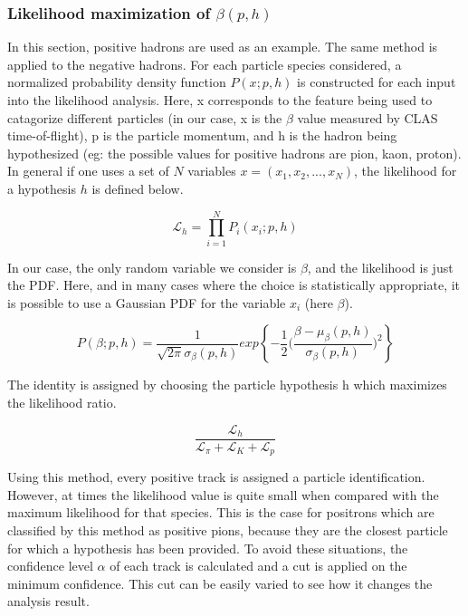 
\subsubsection*{Likelihood maximization of $\beta(p,h)$}
In this section, positive hadrons are used as an example.  The same method is applied to the negative hadrons.  For each particle species considered, a normalized probability density function $P(x;p,h)$ is constructed for each input into the likelihood analysis.  Here, x corresponds to the feature being used to catagorize different particles (in our case, x is the $\beta$ value measured by CLAS time-of-flight), p is the particle momentum, and h is the hadron being hypothesized (eg: the possible values for positive hadrons are pion, kaon, proton).  In general if one uses a set of $N$ variables $x = (x_1, x_2, ..., x_N)$, the likelihood for a hypothesis $h$ is defined below.

\begin{equation}
  \mathcal{L}_h = \prod^{N}_{i=1} P_{i} (x_i; p, h)
\end{equation}

In our case, the only random variable we consider is $\beta$, and the likelihood is just the PDF.  Here, and in many cases where the choice is statistically appropriate, it is possible to use a Gaussian PDF for the variable $x_i$ (here $\beta$).

\begin{equation}
  P(\beta;p,h) = \frac{1}{\sqrt{2 \pi} \sigma_\beta(p,h) } exp \left \{ -\frac{1}{2} \bigg( \frac{\beta - \mu_\beta(p,h)}{\sigma_\beta(p,h)} \bigg)^2 \right \}
\end{equation}

The identity is assigned by choosing the particle hypothesis h which maximizes the likelihood ratio.  
 
\begin{equation}
  \frac{\mathcal{L}_h}{\mathcal{L}_{\pi}+\mathcal{L}_{K}+\mathcal{L}_{p}}
\end{equation}

Using this method, every positive track is assigned a particle identification.  However, at times the likelihood value is quite small when compared with the maximum likelihood for that species.  This is the case for positrons which are classified by this method as positive pions, because they are the closest particle for which a hypothesis has been provided.  To avoid these situations, the confidence level $\alpha$ of each track is calculated and a cut is applied on the minimum confidence.  This cut can be easily varied to see how it changes the analysis result.

